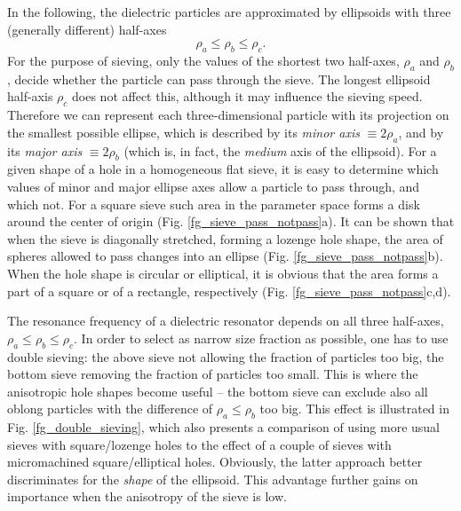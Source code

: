 In the following, the dielectric particles are approximated by ellipsoids with three (generally different) half-axes $$\rho_a \leq \rho_b \leq \rho_c.$$ For the purpose of sieving, only the values of the shortest two half-axes, $\rho_a$ and $\rho_b$, decide whether the particle can pass through the sieve. The longest ellipsoid half-axis $\rho_c$ does not affect this, although it may influence the sieving speed. Therefore we can represent each three-dimensional particle with its projection on the smallest possible ellipse, which is described by its \textit{minor axis} $\equiv 2\rho_a$, and by its \textit{major axis} $\equiv 2\rho_b$ (which is, in fact, the \textit{medium} axis of the ellipsoid). For a given shape of a hole in a homogeneous flat sieve, it is easy to determine which values of minor and major ellipse axes allow a particle to pass through, and which not. For a square sieve such area in the parameter space forms a disk around the center of origin (Fig. \ref{fg_sieve_pass_notpass}a). It can be shown that when the sieve is diagonally stretched, forming a lozenge hole shape, the area of spheres allowed to pass changes into an ellipse (Fig. \ref{fg_sieve_pass_notpass}b). When the hole shape is circular or elliptical, it is obvious that the area forms a part of a square or of a rectangle, respectively  (Fig. \ref{fg_sieve_pass_notpass}c,d).

The resonance frequency of a dielectric resonator depends on all three half-axes, $\rho_a \leq \rho_b \leq \rho_c$. In order to select as narrow size fraction as possible, one has to use double sieving: the above sieve not allowing the fraction of particles too big, the bottom sieve removing the fraction of particles too small. This is where the anisotropic hole shapes become useful -- the bottom sieve can exclude also all oblong particles with the difference of $\rho_a \leq \rho_b$ too big. This effect is illustrated in Fig. \ref{fg_double_sieving}, which also presents a comparison of using more usual sieves with square/lozenge holes to the effect of a couple of sieves with micromachined square/elliptical holes. Obviously, the latter approach better discriminates for the \textit{shape} of the ellipsoid. This advantage further gains on importance when the anisotropy of the sieve is low.

